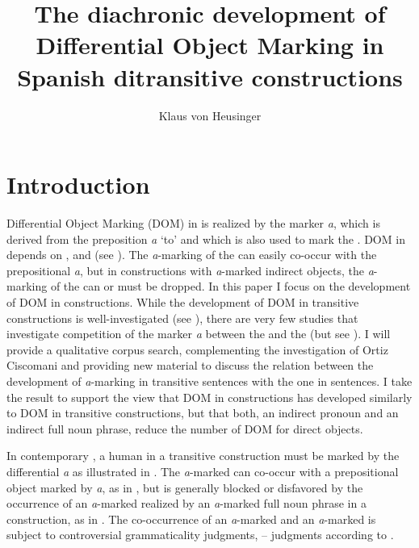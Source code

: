 \documentclass[output=paper]{LSP/langsci}
\author{Klaus von Heusinger \affiliation{Universität zu Köln}}
\title{The diachronic development of Differential Object Marking in Spanish ditransitive constructions}
\begin{document}
\section{Introduction} %
\label{11-he-sec:1}

Differential Object Marking (DOM) in  is realized by the marker \textit{a}, which is derived from the preposition \textit{a} ‘to’ and which is also used to mark the . DOM in  depends on ,  and  (see \citealt{Pensado1995Complemento,Brugeetal1996Accusative,Leonetti2004Specificity,vonHeusingeretal2007Differential}). The \textit{a}-marking of the  can easily co-occur with the prepositional \textit{a}, but in  constructions with \textit{a}-marked indirect objects, the \textit{a}-marking of the  can or must be dropped. 
In this paper I focus on the development of DOM in   constructions. While the development of DOM in transitive constructions is well-investigated (see \citealt{Melis1995Objetodirecto,Laca2002Gramaticalizacion,Laca2006Objeto,vonHeusinger2008Verbal}), there are very few studies that investigate competition of the marker \textit{a} between the  and the  (but see \citealt{Company1998Interplay,Company2002Avance,Ortiz2005Objetos,Ortiz2011Construcciones,Mondonedo2007Syntax}). I will provide a qualitative corpus search, complementing the investigation of Ortiz Ciscomani  and providing new material to discuss the relation between the development of \textit{a}-marking in transitive sentences with the one in  sentences. I take the result to support the view that DOM in  constructions has developed similarly to DOM in transitive constructions, but that both, an indirect pronoun and an indirect full noun phrase, reduce the number of DOM for direct objects. 

In contemporary , a human   in a transitive construction must be marked by the differential  \textit{a} as illustrated in . The \textit{a}-marked   can co-occur with a prepositional object marked by \textit{a}, as in , but is generally blocked or disfavored by the occurrence of an \textit{a}-marked  realized by an \textit{a}-marked full noun phrase in a  construction, as in . The co-occurrence of an \textit{a}-marked  and an \textit{a}-marked  is subject to controversial grammaticality judgments, \cf {} – judgments according to \citet[20]{CompanyCompany2001Multiple}. 
\end{document}
